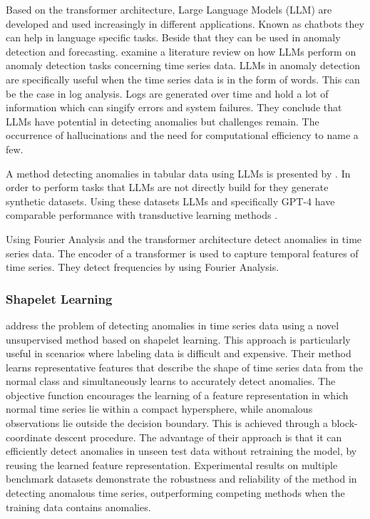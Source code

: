 Based on the transformer architecture, Large Language Models (LLM) are developed and used increasingly in different applications. Known as chatbots they can help in language specific tasks. Beside that they can be used in anomaly detection and forecasting. \cite{su_large_2024} examine a literature review on how LLMs perform on anomaly detection tasks concerning time series data. LLMs in anomaly detection are specifically useful when the time series data is in the form of words. This can be the case in log analysis. Logs are generated over time and hold a lot of information which can singify errors and system failures. They conclude that LLMs have potential in detecting anomalies but challenges remain. The occurrence of hallucinations and the need for computational efficiency to name a few.

A method detecting anomalies in tabular data using LLMs is presented by \cite{li_anomaly_2024}. In order to perform tasks that LLMs are not directly build for they generate synthetic datasets. Using these datasets LLMs and specifically GPT-4 have comparable performance with transductive learning methods \cite[p. 6]{li_anomaly_2024}.

Using Fourier Analysis and the transformer architecture \cite{ye_multivariate_2023} detect anomalies in time series data. The encoder of a transformer is used to capture temporal features of time series. They detect frequencies by using Fourier Analysis.

\subsubsection{Shapelet Learning}
\cite{beggel_time_2019} address the problem of detecting anomalies in time series data using a novel unsupervised method based on shapelet learning. This approach is particularly useful in scenarios where labeling data is difficult and expensive.
Their method learns representative features that describe the shape of time series data from the normal class and simultaneously learns to accurately detect anomalies. The objective function encourages the learning of a feature representation in which normal time series lie within a compact hypersphere, while anomalous observations lie outside the decision boundary. This is achieved through a block-coordinate descent procedure.
The advantage of their approach is that it can efficiently detect anomalies in unseen test data without retraining the model, by reusing the learned feature representation. Experimental results on multiple benchmark datasets demonstrate the robustness and reliability of the method in detecting anomalous time series, outperforming competing methods when the training data contains anomalies.

